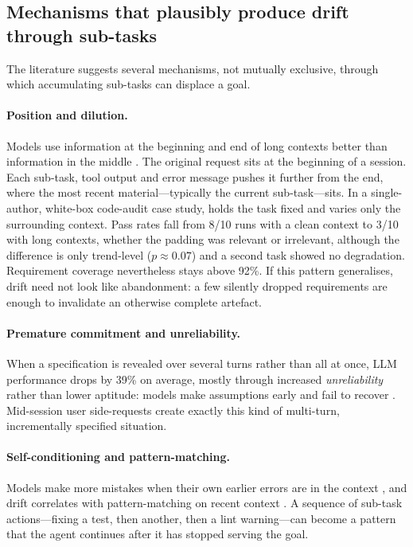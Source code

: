 \subsection{Mechanisms that plausibly produce drift through sub-tasks}

The literature suggests several mechanisms, not mutually exclusive, through which accumulating
sub-tasks can displace a goal.

\paragraph{Position and dilution.} Models use information at the beginning and end of long contexts
better than information in the middle \citep{liu2024lost}. The original request sits at the
beginning of a session. Each sub-task, tool output and error message pushes it further from the
end, where the most recent material---typically the current sub-task---sits. In a single-author,
white-box code-audit case study, \citet{xue2026contextrot} holds the task fixed and varies only the
surrounding context. Pass rates fall from 8/10 runs with a clean context to 3/10 with long contexts,
whether the padding was relevant or irrelevant, although the difference is only trend-level
($p\approx0.07$) and a second task showed no degradation. Requirement coverage nevertheless stays
above 92\%. If this pattern generalises, drift need not look like abandonment: a few silently dropped
requirements are enough to invalidate an otherwise complete artefact.

\paragraph{Premature commitment and unreliability.} When a specification is revealed over several
turns rather than all at once, LLM performance drops by 39\% on average, mostly through increased
\emph{unreliability} rather than lower aptitude: models make assumptions early and fail to recover
\citep{laban2025lost}. Mid-session user side-requests create exactly this kind of multi-turn,
incrementally specified situation.

\paragraph{Self-conditioning and pattern-matching.} Models make more mistakes when their own earlier
errors are in the context \citep{sinha2025illusion}, and drift correlates with pattern-matching on
recent context \citep{arike2025goaldrift}. A sequence of sub-task actions---fixing a test, then
another, then a lint warning---can become a pattern that the agent continues after it has stopped
serving the goal.

